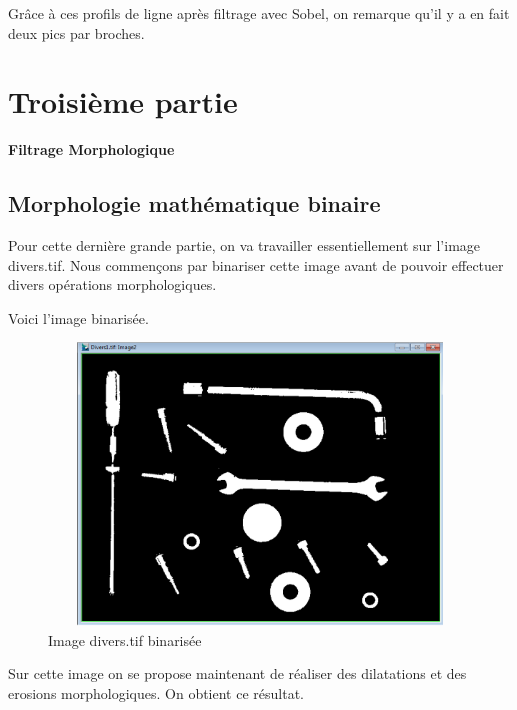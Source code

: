 \documentclass{scrreprt}
\begin{document}
Grâce à ces profils de ligne après filtrage avec Sobel, on remarque qu'il y a en fait deux pics par broches.

\newpage
\chapter{Troisième partie}

\begin{center}
\large{
\textbf{Filtrage Morphologique}}
\end{center}

\section{Morphologie mathématique binaire}


Pour cette dernière grande partie, on va travailler essentiellement sur l'image divers.tif.
Nous commençons par binariser cette image avant de pouvoir effectuer divers opérations morphologiques. 

Voici l'image binarisée. 

\begin{figure}[!h]
\centering
\includegraphics[height=7.5cm,width=15cm]{images/diversbinpes.png}
\caption{Image divers.tif binarisée}
\end{figure}

\newpage
Sur cette image on se propose maintenant de réaliser des dilatations et des erosions morphologiques. 
On obtient ce résultat. 
\end{document}
